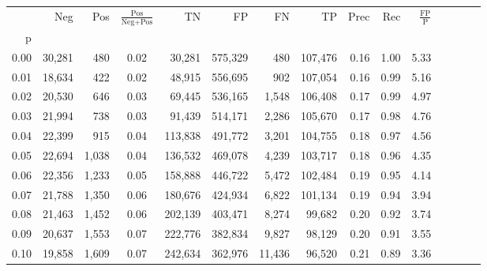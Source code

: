 \begin{tabular}{rrrcrrrrrrrrrrr}
\toprule
{} &     Neg &    Pos & $\frac{\text{Pos}}{\text{Neg}+\text{Pos}}$ &       TN &       FP &       FN &       TP &  Prec &   Rec & $\frac{\text{FP}}{\text{P}}$ \\
p    &         &        &                                            &          &          &          &          &       &       &                              \\
\midrule
0.00 &  30,281 &    480 &                                       0.02 &   30,281 &  575,329 &      480 &  107,476 &  0.16 &  1.00 &                         5.33 \\
0.01 &  18,634 &    422 &                                       0.02 &   48,915 &  556,695 &      902 &  107,054 &  0.16 &  0.99 &                         5.16 \\
0.02 &  20,530 &    646 &                                       0.03 &   69,445 &  536,165 &    1,548 &  106,408 &  0.17 &  0.99 &                         4.97 \\
0.03 &  21,994 &    738 &                                       0.03 &   91,439 &  514,171 &    2,286 &  105,670 &  0.17 &  0.98 &                         4.76 \\
0.04 &  22,399 &    915 &                                       0.04 &  113,838 &  491,772 &    3,201 &  104,755 &  0.18 &  0.97 &                         4.56 \\
0.05 &  22,694 &  1,038 &                                       0.04 &  136,532 &  469,078 &    4,239 &  103,717 &  0.18 &  0.96 &                         4.35 \\
0.06 &  22,356 &  1,233 &                                       0.05 &  158,888 &  446,722 &    5,472 &  102,484 &  0.19 &  0.95 &                         4.14 \\
0.07 &  21,788 &  1,350 &                                       0.06 &  180,676 &  424,934 &    6,822 &  101,134 &  0.19 &  0.94 &                         3.94 \\
0.08 &  21,463 &  1,452 &                                       0.06 &  202,139 &  403,471 &    8,274 &   99,682 &  0.20 &  0.92 &                         3.74 \\
0.09 &  20,637 &  1,553 &                                       0.07 &  222,776 &  382,834 &    9,827 &   98,129 &  0.20 &  0.91 &                         3.55 \\
0.10 &  19,858 &  1,609 &                                       0.07 &  242,634 &  362,976 &   11,436 &   96,520 &  0.21 &  0.89 &                         3.36 \\

\end{tabular}
